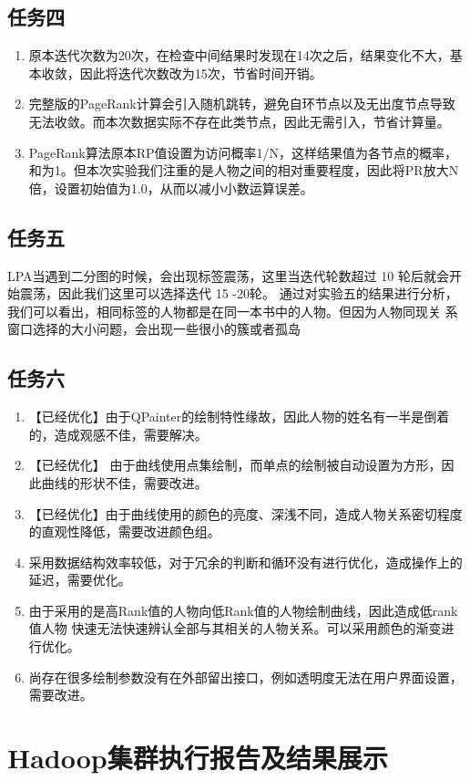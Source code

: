 \documentclass[a4paper,UTF8]{article}
\numberwithin{equation}{section}
\begin{document}
\subsection{任务四}
\begin{enumerate}[1)]
    \item 原本迭代次数为20次，在检查中间结果时发现在14次之后，结果变化不大，基本收敛，因此将迭代次数改为15次，节省时间开销。
    \item 完整版的PageRank计算会引入随机跳转，避免自环节点以及无出度节点导致无法收敛。而本次数据实际不存在此类节点，因此无需引入，节省计算量。
    \item PageRank算法原本RP值设置为访问概率1/N，这样结果值为各节点的概率，和为1。但本次实验我们注重的是人物之间的相对重要程度，因此将PR放大N倍，设置初始值为1.0，从而以减小小数运算误差。
\end{enumerate}
\subsection{任务五}
LPA当遇到二分图的时候，会出现标签震荡，这里当迭代轮数超过 10 轮后就会开始震荡，因此我们这里可以选择迭代 15 -20轮。
通过对实验五的结果进行分析，我们可以看出，相同标签的人物都是在同一本书中的人物。但因为人物同现关
系窗口选择的大小问题，会出现一些很小的簇或者孤岛
\subsection{任务六}
\begin{enumerate}[1)]
    \item 【已经优化】由于QPainter的绘制特性缘故，因此人物的姓名有一半是倒着的，造成观感不佳，需要解决。
    \item 【已经优化】 由于曲线使用点集绘制，而单点的绘制被自动设置为方形，因此曲线的形状不佳，需要改进。
    \item 【已经优化】由于曲线使用的颜色的亮度、深浅不同，造成人物关系密切程度的直观性降低，需要改进颜色组。
    \item 采用数据结构效率较低，对于冗余的判断和循环没有进行优化，造成操作上的延迟，需要优化。
    \item 由于采用的是高Rank值的人物向低Rank值的人物绘制曲线，因此造成低rank值人物
    快速无法快速辨认全部与其相关的人物关系。可以采用颜色的渐变进行优化。
    \item 尚存在很多绘制参数没有在外部留出接口，例如透明度无法在用户界面设置，需要改进。
\end{enumerate}

\section{Hadoop集群执行报告及结果展示}
\end{document}
